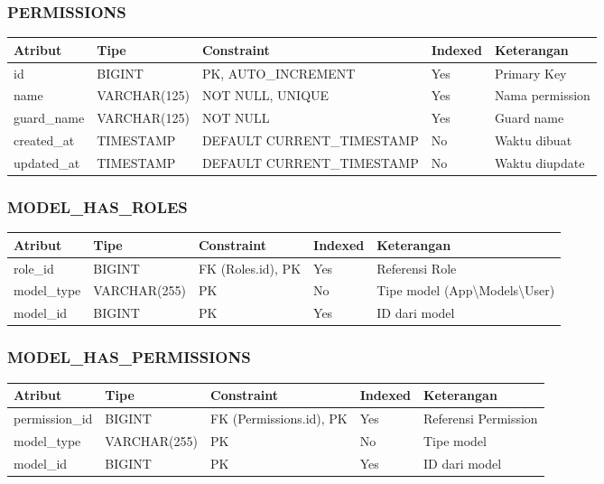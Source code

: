 \documentclass[12pt,a4paper]{article}
\begin{document}
\subsubsection{PERMISSIONS}
\begin{tabularx}{\textwidth}{|l|l|l|l|X|}
\hline
\textbf{Atribut} & \textbf{Tipe} & \textbf{Constraint} & \textbf{Indexed} & \textbf{Keterangan} \\
\hline
id & BIGINT & PK, AUTO\_INCREMENT & Yes & Primary Key \\
\hline
name & VARCHAR(125) & NOT NULL, UNIQUE & Yes & Nama permission \\
\hline
guard\_name & VARCHAR(125) & NOT NULL & Yes & Guard name \\
\hline
created\_at & TIMESTAMP & DEFAULT CURRENT\_TIMESTAMP & No & Waktu dibuat \\
\hline
updated\_at & TIMESTAMP & DEFAULT CURRENT\_TIMESTAMP & No & Waktu diupdate \\
\hline
\end{tabularx}

\subsubsection{MODEL\_HAS\_ROLES}
\begin{tabularx}{\textwidth}{|l|l|l|l|X|}
\hline
\textbf{Atribut} & \textbf{Tipe} & \textbf{Constraint} & \textbf{Indexed} & \textbf{Keterangan} \\
\hline
role\_id & BIGINT & FK (Roles.id), PK & Yes & Referensi Role \\
\hline
model\_type & VARCHAR(255) & PK & No & Tipe model (App\textbackslash Models\textbackslash User) \\
\hline
model\_id & BIGINT & PK & Yes & ID dari model \\
\hline
\end{tabularx}

\subsubsection{MODEL\_HAS\_PERMISSIONS}
\begin{tabularx}{\textwidth}{|l|l|l|l|X|}
\hline
\textbf{Atribut} & \textbf{Tipe} & \textbf{Constraint} & \textbf{Indexed} & \textbf{Keterangan} \\
\hline
permission\_id & BIGINT & FK (Permissions.id), PK & Yes & Referensi Permission \\
\hline
model\_type & VARCHAR(255) & PK & No & Tipe model \\
\hline
model\_id & BIGINT & PK & Yes & ID dari model \\
\hline
\end{tabularx}
\end{document}
